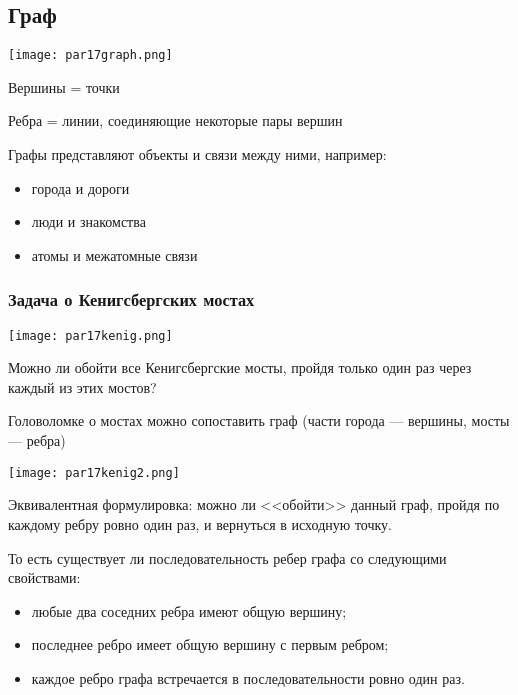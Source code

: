 \subsection{Граф}

\begin{center}
\texttt{[image: par17graph.png]}
\end{center}

Вершины = точки 

Ребра = линии, соединяющие некоторые пары вершин

Графы представляют объекты и связи между ними, например:

\begin{itemize}
    \item города и дороги
    \item люди и знакомства
    \item атомы и межатомные связи
\end{itemize}

\subsubsection*{Задача о Кенигсбергских мостах}

\begin{center}
    \texttt{[image: par17kenig.png]}
\end{center}

Можно ли обойти все Кенигсбергские мосты, пройдя только один раз через каждый из этих мостов?

Головоломке о мостах можно сопоставить граф (части города --- вершины, мосты --- ребра)

\begin{center}
    \texttt{[image: par17kenig2.png]}
\end{center}

Эквивалентная формулировка: можно ли <<обойти>> данный граф, пройдя по каждому ребру ровно один раз, и вернуться в исходную точку.

То есть существует ли последовательность ребер графа со следующими свойствами:
\begin{itemize}
    \item любые два соседних ребра имеют общую вершину;
    
    \item последнее ребро имеет общую вершину с первым ребром;
    
    \item каждое ребро графа встречается в последовательности ровно один раз.
\end{itemize}

